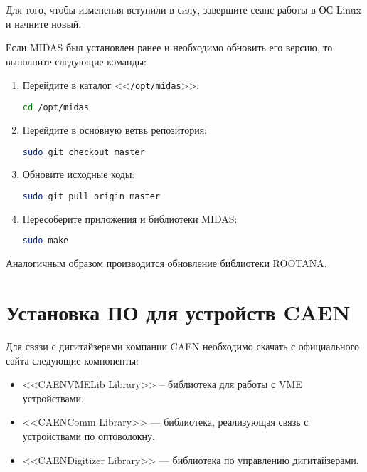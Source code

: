 \documentclass[12pt, a4paper, oneside, onecolumn]{book}
\newcommand{\MIDAS}{\mbox{MIDAS}}
\newcommand{\ROOTANA}{\mbox{ROOTANA}}
\newcommand{\DIRECTORY}[1]{<<{\tt #1}>>}
\begin{document}
Для того, чтобы изменения вступили в силу, завершите сеанс работы в ОС Linux и начните новый.

Если \MIDAS{} был установлен ранее и необходимо обновить его версию, то выполните следующие команды:

\begin{enumerate}
\item Перейдите в каталог \DIRECTORY{/opt/midas}:

\begin{lstlisting}[language=bash]
cd /opt/midas
\end{lstlisting}

\item Перейдите в основную ветвь репозитория:

\begin{lstlisting}[language=bash]
sudo git checkout master
\end{lstlisting}

\item Обновите исходные коды:

\begin{lstlisting}[language=bash]
sudo git pull origin master
\end{lstlisting}

\item Пересоберите приложения и библиотеки \MIDAS{}:

\begin{lstlisting}[language=bash]
sudo make
\end{lstlisting}

\end{enumerate}

Аналогичным образом производится обновление библиотеки \ROOTANA{}.

\section{Установка ПО для устройств CAEN}

Для связи с дигитайзерами компании CAEN необходимо скачать с официального сайта \cite{CaenHome} следующие компоненты:

\begin{itemize}

\item <<CAENVMELib Library>> -- библиотека для работы с VME устройствами.

\item <<CAENComm Library>> --- библиотека, реализующая связь с устройствами по оптоволокну.

\item <<CAENDigitizer Library>> --- библиотека по управлению дигитайзерами.

\end{itemize}
\end{document}
